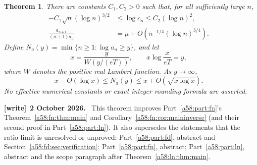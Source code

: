 \documentclass[11pt,letterpaper]{article}
\newtheorem{theorem}{Theorem}[section]
\theoremstyle{remark}
\newenvironment{writenote}[1][]{\par\smallskip\begingroup\small
 \noindent\textbf{[write]}\if\relax\detokenize{#1}\relax\else~\textbf{#1.}\fi\ }%
 {\par\endgroup\smallskip}
\begin{document}
\begin{theorem}\label{a58:rt:thm:main}
There are constants $C_1,C_2>0$ such that, for all sufficiently large $n$,
\begin{align}
 -C_1\sqrt n(\log n)^{3/2}&\le\log c_n\le C_2(\log n)^2,
 \label{a58:rt:eq:mainenclosure}\\
 \frac{a_{n+1}}{(n+1)a_n}
 &=\mu+O\!\left(n^{-1/4}(\log n)^{3/4}\right).
 \label{a58:rt:eq:mainratio}
\end{align}
Define $N_a(y)=\min\{n\ge1:\log a_n\ge y\}$, and let
\begin{equation}\label{a58:rt:eq:lambert}
 x=\frac{y}{W(y/(eT))},
 \qquad x\log\frac{x}{eT}=y,
\end{equation}
where $W$ denotes the positive real Lambert function. As $y\to\infty$,
\begin{equation}\label{a58:rt:eq:maininverse}
 x-O(\log x)\le N_a(y)\le x+O\!\left(\sqrt{x\log x}\right).
\end{equation}
No effective numerical constants or exact integer rounding formula are
asserted.
\end{theorem}
\begin{writenote}[2 October 2026]
This theorem improves Part~\ref{a58:part:fn}'s Theorem~\ref{a58:fn:thm:main} and Corollary~\ref{a58:fn:cor:maininverse} (and their second proof in Part~\ref{a58:part:ln}). It also supersedes the statements that the ratio limit is unresolved or unproved: Part~\ref{a58:part:fd}, abstract and Section~\ref{a58:fd:sec:verification}; Part~\ref{a58:part:fn}, abstract; Part~\ref{a58:part:ln}, abstract and the scope paragraph after Theorem~\ref{a58:ln:thm:main}.
\end{writenote}
\end{document}
